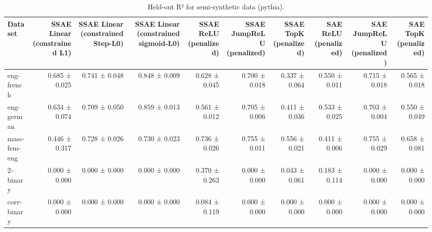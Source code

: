 \begin{table}[t]
\centering
\caption{Held-out R² for semi-synthetic data (pythia).}
\label{tab:semisynthetic-pythia-r2}
\begin{tabular}{lrrrrrrrrr}
\toprule
Dataset & SSAE Linear (constrained L1) & SSAE Linear (constrained Step-L0) & SSAE Linear (constrained sigmoid-L0) & SSAE ReLU (penalized) & SSAE JumpReLU (penalized) & SSAE TopK (penalized) & SAE ReLU (penalized) & SAE JumpReLU (penalized) & SAE TopK (penalized) \\
\midrule
eng-french & 0.685 ± 0.025 & 0.741 ± 0.048 & 0.848 ± 0.009 & 0.628 ± 0.045 & 0.700 ± 0.018 & 0.337 ± 0.064 & 0.550 ± 0.011 & 0.715 ± 0.018 & 0.565 ± 0.018 \\
eng-german & 0.634 ± 0.074 & 0.709 ± 0.050 & 0.859 ± 0.013 & 0.561 ± 0.012 & 0.705 ± 0.006 & 0.411 ± 0.036 & 0.533 ± 0.025 & 0.703 ± 0.004 & 0.550 ± 0.049 \\
masc-fem-eng & 0.446 ± 0.317 & 0.728 ± 0.026 & 0.730 ± 0.023 & 0.736 ± 0.026 & 0.755 ± 0.011 & 0.556 ± 0.021 & 0.411 ± 0.006 & 0.755 ± 0.029 & 0.658 ± 0.081 \\
2-binary & 0.000 ± 0.000 & 0.000 ± 0.000 & 0.000 ± 0.000 & 0.370 ± 0.263 & 0.000 ± 0.000 & 0.043 ± 0.061 & 0.183 ± 0.114 & 0.000 ± 0.000 & 0.000 ± 0.000 \\
corr-binary & 0.000 ± 0.000 & 0.000 ± 0.000 & 0.000 ± 0.000 & 0.084 ± 0.119 & 0.000 ± 0.000 & 0.000 ± 0.000 & 0.000 ± 0.000 & 0.000 ± 0.000 & 0.000 ± 0.000 \\
\bottomrule
\end{tabular}
\end{table}
